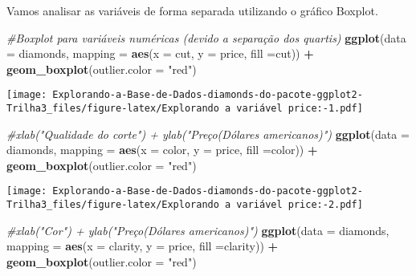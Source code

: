 \documentclass[
]{article}
\newenvironment{Shaded}{\begin{snugshade}}{\end{snugshade}}
\newcommand{\CommentTok}[1]{\textcolor[rgb]{0.56,0.35,0.01}{\textit{#1}}}
\newcommand{\DataTypeTok}[1]{\textcolor[rgb]{0.13,0.29,0.53}{#1}}
\newcommand{\KeywordTok}[1]{\textcolor[rgb]{0.13,0.29,0.53}{\textbf{#1}}}
\newcommand{\NormalTok}[1]{#1}
\newcommand{\OperatorTok}[1]{\textcolor[rgb]{0.81,0.36,0.00}{\textbf{#1}}}
\newcommand{\StringTok}[1]{\textcolor[rgb]{0.31,0.60,0.02}{#1}}
\begin{document}
Vamos analisar as variáveis de forma separada utilizando o gráfico
Boxplot.

\begin{Shaded}
\begin{Highlighting}[]
\CommentTok{#Boxplot para variáveis numéricas (devido a separação dos quartis)}
\KeywordTok{ggplot}\NormalTok{(}\DataTypeTok{data =}\NormalTok{ diamonds, }\DataTypeTok{mapping =} \KeywordTok{aes}\NormalTok{(}\DataTypeTok{x =}\NormalTok{ cut, }\DataTypeTok{y =}\NormalTok{ price, }\DataTypeTok{fill =}\NormalTok{cut)) }\OperatorTok{+}\StringTok{ }\KeywordTok{geom_boxplot}\NormalTok{(}\DataTypeTok{outlier.color =} \StringTok{"red"}\NormalTok{)}
\end{Highlighting}
\end{Shaded}

\texttt{[image: Explorando-a-Base-de-Dados-diamonds-do-pacote-ggplot2-Trilha3\_files/figure-latex/Explorando a variável price:-1.pdf]}

\begin{Shaded}
\begin{Highlighting}[]
\CommentTok{#xlab("Qualidade do corte") + ylab("Preço(Dólares americanos)")}
\KeywordTok{ggplot}\NormalTok{(}\DataTypeTok{data =}\NormalTok{ diamonds, }\DataTypeTok{mapping =} \KeywordTok{aes}\NormalTok{(}\DataTypeTok{x =}\NormalTok{ color, }\DataTypeTok{y =}\NormalTok{ price, }\DataTypeTok{fill =}\NormalTok{color)) }\OperatorTok{+}\StringTok{ }\KeywordTok{geom_boxplot}\NormalTok{(}\DataTypeTok{outlier.color =} \StringTok{"red"}\NormalTok{)}
\end{Highlighting}
\end{Shaded}

\texttt{[image: Explorando-a-Base-de-Dados-diamonds-do-pacote-ggplot2-Trilha3\_files/figure-latex/Explorando a variável price:-2.pdf]}

\begin{Shaded}
\begin{Highlighting}[]
\CommentTok{#xlab("Cor") + ylab("Preço(Dólares americanos)")}
\KeywordTok{ggplot}\NormalTok{(}\DataTypeTok{data =}\NormalTok{ diamonds, }\DataTypeTok{mapping =} \KeywordTok{aes}\NormalTok{(}\DataTypeTok{x =}\NormalTok{ clarity, }\DataTypeTok{y =}\NormalTok{ price, }\DataTypeTok{fill =}\NormalTok{clarity)) }\OperatorTok{+}\StringTok{ }\KeywordTok{geom_boxplot}\NormalTok{(}\DataTypeTok{outlier.color =} \StringTok{"red"}\NormalTok{)}
\end{Highlighting}
\end{Shaded}
\end{document}
